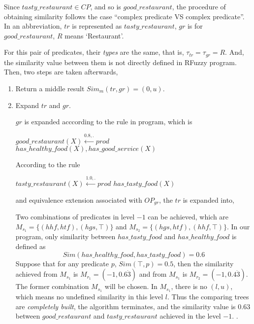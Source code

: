\begin{itemize}
Since $tasty\_restaurant \in CP$, and so is $good\_restaurant$, the procedure of obtaining similarity follows the case ``complex predicate VS complex predicate''.
In an abbreviation, $tr$ is represented as $tasty\_restaurant$, $gr$ is for $good\_restaurant$, $R$ means `Restaurant'.

For this pair of predicates, their \textit{types} are the same, that is, $\tau_{tr}=\tau_{gr}=R$. And, the similarity value between them is not directly defined in RFuzzy program. Then, two steps are taken afterwards,
\begin{enumerate}
 \item Return a middle result $Sim_{m}(tr,gr)=(0,u)$.
 \item Expand $tr$ and $gr$. 
      
       $gr$ is expanded acccording to the rule in program, which is 
      \begin{center}
       $good\_restaurant(X) \stackrel{0.8,.}{\longleftarrow} prod$ $has\_healthy\_food(X), has\_good\_service(X)$ 
      \end{center}
      According to the rule
      \begin{center}
         $tasty\_restaurant(X) \stackrel{1.0,.}{\longleftarrow} prod$ $has\_tasty\_food(X)$
      \end{center}
      and equivalence extension associated with $OP_{gr}$, the $tr$ is expanded into,
      
       Two combinations of predicates in level $-1$ can be achieved, which are $M_{s_1}=\{(hhf,htf),(hgs,\top)\}$ and $M_{s_2}=\{(hgs,htf),(hhf,\top)\}$. In our program, only similarity between $has\_tasty\_food$ and $has\_healthy\_food$ is defined as \[Sim(has\_healthy\_food, has\_tasty\_food) = 0.6\]
       Suppose that for any predicate $p$, $Sim(\top,p)=0.5$, then the similarity achieved from $M_{s_1}$ is $M_{r_1}=(-1,0.6\dot{3})$ and from $M_{s_1}$ is $M_{r_2}=(-1,0.4\dot{3})$. The former combination $M_{s_1}$ will be chosen. In $M_{s_1}$, there is no $(l,u)$, which means no undefined similarity in this level $l$. Thus the comparing trees are \textit{completely built}, the algorithm terminates, and the similarity value is $0.63$ between $good\_restaurant$ and $tasty\_restaurant$ achieved in the level $-1$.       .  
\end{enumerate}

\end{itemize}


